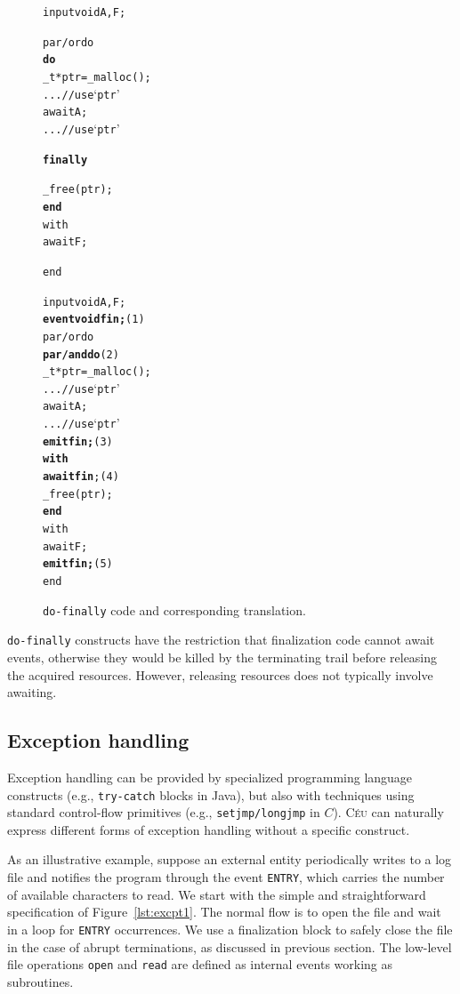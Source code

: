 \documentclass[preprint]{sigplanconf}
\newcommand{\CEU}{\textsc{C\'{e}u}\xspace}
\newcommand{\code}[1] {{\small{\texttt{#1}}}}
\newcommand{\DOFIN}{\code{do-finally}\xspace}
\newcommand{\1}{\;}
\newcommand{\2}{\;\;}
\newcommand{\3}{\;\;\;}
\newcommand{\5}{\;\;\;\;\;}
\begin{document}
\begin{figure}[t]
{\small
\begin{minipage}[t]{0.45\linewidth}
\begin{alltt}
  input void A,F;

  par/or do
    \textbf{do}
      \_t* ptr = \_malloc();
      ... // use `ptr'
      await A;
      ... // use `ptr'

    \textbf{finally}

      \_free(ptr);
    \textbf{end}
  with
    await F;

  end
\end{alltt}
\end{minipage}
%
\hspace{0.5cm}
%
\begin{minipage}[t]{0.45\linewidth}
\begin{alltt}
input void A,F;
\textbf{event void fin;}      (1)
par/or do
  \textbf{par/and do}          (2)
    \_t* ptr = \_malloc();
    ... // use `ptr'
    await A;
    ... // use `ptr'
    \textbf{emit fin;}        (3)
  \textbf{with}
    \textbf{await fin};       (4)
    \_free(ptr);
  \textbf{end}
with
  await F;
  \textbf{emit fin;}          (5)
end
\end{alltt}
\end{minipage}

\caption{ \DOFIN code and corresponding translation.
\label{lst:finally}
}
}
\end{figure}

\DOFIN constructs have the restriction that finalization code cannot await 
events, otherwise they would be killed by the terminating trail before 
releasing the acquired resources.
However, releasing resources does not typically involve awaiting.

\subsection{Exception handling}
\label{sec.adv.excpt}

Exception handling can be provided by specialized programming language 
constructs (e.g., \code{try-catch} blocks in Java), but also with techniques 
using standard control-flow primitives (e.g., \code{setjmp/longjmp} in $C$).
\CEU can naturally express different forms of exception handling without a 
specific construct.

As an illustrative example, suppose an external entity periodically writes to a 
log file and notifies the program through the event \code{ENTRY}, which carries 
the number of available characters to read.
We start with the simple and straightforward specification of 
Figure~\ref{lst:excpt1}.
The normal flow is to open the file and wait in a loop for \code{ENTRY} 
occurrences.
We use a finalization block to safely close the file in the case of abrupt 
terminations, as discussed in previous section.
The low-level file operations \code{open} and \code{read} are defined as 
internal events working as subroutines.
\end{document}
